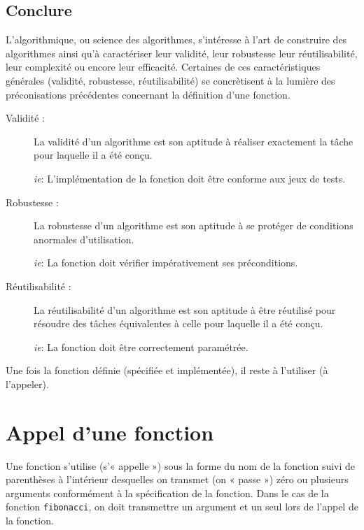 \subsection{Conclure}
L'algorithmique, ou science des algorithmes, s'intéresse à l'art de construire 
des algorithmes ainsi qu'à caractériser leur validité, leur robustesse
leur réutilisabilité, leur complexité ou encore leur efficacité. Certaines 
de ces caractéristiques générales (validité, robustesse, réutilisabilité) 
se concrètisent à la lumière des préconisations précédentes concernant 
la définition d'une fonction.

\begin{description}
\item[Validité :] La validité d'un algorithme est son aptitude à réaliser 
	exactement la tâche pour laquelle il a été conçu.
	
	{\em ie}: L'implémentation de la fonction doit être conforme aux jeux de tests.
\item[Robustesse :] La robustesse d'un algorithme est son aptitude à se 
	protéger de conditions anormales d'utilisation.

	{\em ie}: La fonction doit vérifier impérativement ses préconditions.
\item[Réutilisabilité :] La réutilisabilité d'un algorithme est son aptitude 
	à être réutilisé pour résoudre des tâches équivalentes à celle pour 
	laquelle il a été conçu.	

	{\em ie}: La fonction doit être correctement paramétrée.
\end{description}

\noindent Une fois la fonction définie (spécifiée et implémentée), 
il reste à l'utiliser (à l'appeler).


\section{Appel d'une fonction}\label{appel}
Une fonction s'utilise (s'« appelle ») sous la forme du nom de la fonction
suivi de parenthèses à l'intérieur desquelles on transmet (on « passe »)
zéro ou plusieurs arguments conformément à la spécification de la fonction.
Dans le cas de la fonction {\tt fibonacci}, on doit transmettre un argument
et un seul lors de l'appel de la fonction.

